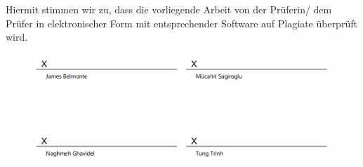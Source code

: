 \documentclass[fontsize=12pt,paper=a4,open=any,parskip=half,
  twoside=false,toc=listof,toc=bibliography,fleqn,leqno,
  captions=nooneline,captions=tableabove,british]{scrbook}
\begin{document}
Hiermit stimmen wir zu, dass die vorliegende Arbeit von der Prüferin/ dem Prüfer in elektronischer Form
mit entsprechender Software auf Plagiate überprüft wird.

\begin{figure}[H]
	\centering
	\includegraphics[width=1\linewidth]{Bilder/unterschrift}
\end{figure}

\tableofcontents
\listoffigures
\listoftables
\lstlistoflistings

\mainmatter %



\end{document}
